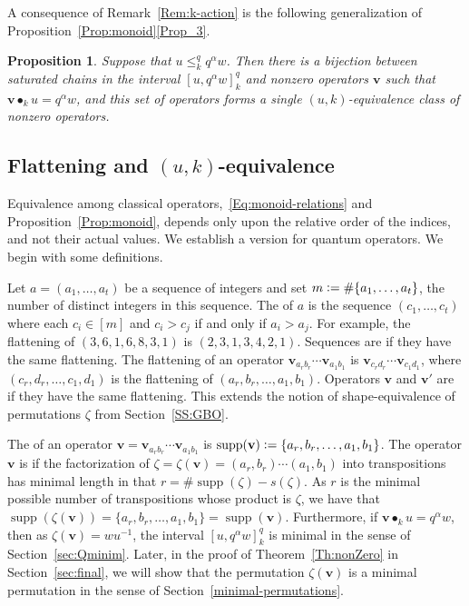 \documentclass[12pt,oneside,reqno]{amsart}
\newtheorem{proposition}[theorem]{Proposition}
\theoremstyle{definition}
\numberwithin{equation}{section}
\newcommand{\qv}{{\mathbf v}}
\DeclareMathOperator{\supp}{supp}
\DeclareMathOperator{\kactionop}{{\scriptstyle \bullet}}
\newcommand{\kaction}[1][k]{\kactionop_{#1}}
\newcommand{\defcolor}[1]{{\color{RoyalBlue}#1}}
\newcommand{\demph}[1]{\defcolor{{\sl #1}}}
\begin{document}
A consequence of Remark~\ref{Rem:k-action} is the following generalization of Proposition~\ref{Prop:monoid}\eqref{Prop_3}.

\begin{proposition}\label{Prop:chains_and_operators}
  Suppose that $u\leq_k^q q^\alpha w$.
  Then there is a bijection between saturated chains in the interval $[u,q^\alpha w]_k^q$ and nonzero operators $\qv$ 
  such that $\qv\kaction u=q^\alpha w$, and this set of operators forms a single $(u,k)$-equivalence class of nonzero operators.
\end{proposition}

\subsection{Flattening and $(u,k)$-equivalence}
\label{SS:Shape-equivalence}

Equivalence among classical operators,~\eqref{Eq:monoid-relations} and
Proposition~\ref{Prop:monoid}, depends only upon the relative order of the indices, and not their actual values.
We establish a version for quantum operators.
We begin with some definitions.

Let $a=(a_1,\dotsc,a_t)$ be a sequence of integers and set $m\vcentcolon=\#\{a_1,\dotsc,a_t\}$, the number of distinct
integers in this sequence.
The \demph{flattening} of $a$ is the sequence $(c_1,\dotsc,c_t)$ where each $c_i\in[m]$ and $c_i>c_j$ if and only if $a_i>a_j$.
For example, the flattening of $(3,6,1,6,8,3,1)$ is $(2,3,1,3,4,2,1)$.
Sequences are \demph{shape-equivalent} if they have the same flattening.
The flattening of an operator $\qv_{a_r b_r}\dotsb\qv_{a_1 b_1}$ is  $\qv_{c_r d_r}\dotsb\qv_{c_1 d_1}$, where $(c_r,d_r,\dotsc,c_1,d_1)$  is
the flattening of $(a_r,b_r,\dotsc,a_1,b_1)$.
Operators $\qv$ and $\qv'$ are \demph{shape-equivalent} if they have the same flattening.
This extends the notion of shape-equivalence of permutations $\zeta$ from Section~\ref{SS:GBO}.

The \demph{support} of an operator $\qv=\qv_{a_r b_r}\dotsb\qv_{a_1 b_1}$ is $\supp(\qv)\vcentcolon=\{a_r,b_r,\dotsc,a_1,b_1\}$.
The operator $\qv$ is \demph{minimal} if the factorization of 
$\zeta=\zeta(\qv)=(a_r,b_r)\dotsb(a_1,b_1)$ into transpositions has minimal length in that
$r=\#\supp(\zeta)-s(\zeta)$.
As $r$ is the minimal possible number of transpositions whose product is $\zeta$, we have that
$\supp(\zeta(\qv))=\{a_r,b_r,\dotsc,a_1,b_1\}=\supp(\qv)$.
Furthermore, if $\qv\kaction u=q^\alpha w$, then as $\zeta(\qv)=wu^{-1}$, the interval $[u,q^\alpha w]_k^q$ is minimal in the
sense of Section~\ref{sec:Qminim}.
Later, in the proof of Theorem~\ref{Th:nonZero} in Section~\ref{sec:final}, we will show that the permutation $\zeta(\qv)$ is a
minimal permutation in the sense of Section~\ref{minimal-permutations}.
\end{document}
